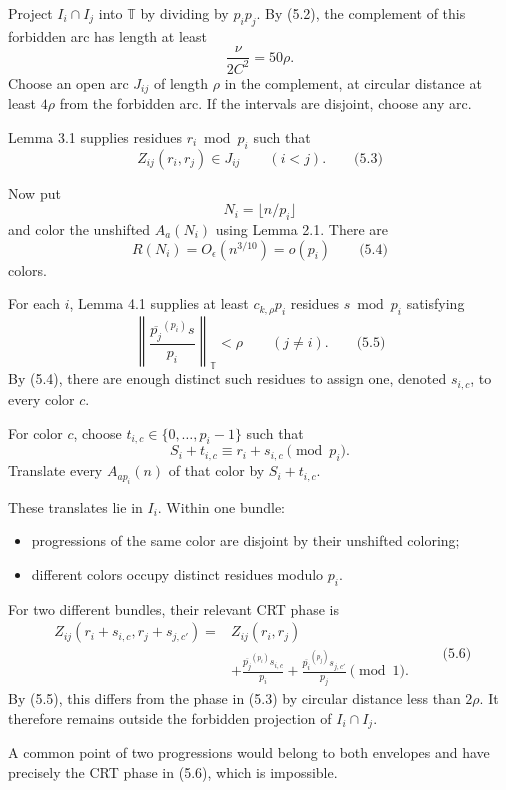 \documentclass[
  11pt,
  a4paper,
]{article}
\providecommand{\tightlist}{%
  \setlength{\itemsep}{0pt}\setlength{\parskip}{0pt}}
\begin{document}
Project \(I_i\cap I_j\) into \(\mathbb T\) by dividing by \(p_ip_j\). By
(5.2), the complement of this forbidden arc has length at least \[
\frac{\nu}{2C^2}=50\rho.
\] Choose an open arc \(J_{ij}\) of length \(\rho\) in the complement,
at circular distance at least \(4\rho\) from the forbidden arc. If the
intervals are disjoint, choose any arc.

Lemma 3.1 supplies residues \(r_i\bmod p_i\) such that \[
Z_{ij}(r_i,r_j)\in J_{ij}
\qquad(i<j).
\qquad\text{(5.3)}
\]

Now put \[
N_i=\lfloor n/p_i\rfloor
\] and color the unshifted \(A_a(N_i)\) using Lemma 2.1. There are \[
R(N_i)=O_\epsilon(n^{3/10})=o(p_i)
\qquad\text{(5.4)}
\] colors.

For each \(i\), Lemma 4.1 supplies at least \(c_{k,\rho}p_i\) residues
\(s\bmod p_i\) satisfying \[
\left\|
\frac{\overline{p_j}^{(p_i)}s}{p_i}
\right\|_{\mathbb T}<\rho
\qquad(j\ne i).
\qquad\text{(5.5)}
\] By (5.4), there are enough distinct such residues to assign one,
denoted \(s_{i,c}\), to every color \(c\).

For color \(c\), choose \(t_{i,c}\in\{0,\ldots,p_i-1\}\) such that \[
S_i+t_{i,c}\equiv r_i+s_{i,c}\pmod{p_i}.
\] Translate every \(A_{ap_i}(n)\) of that color by \(S_i+t_{i,c}\).

These translates lie in \(I_i\). Within one bundle:

\begin{itemize}
\tightlist
\item
  progressions of the same color are disjoint by their unshifted
  coloring;
\item
  different colors occupy distinct residues modulo \(p_i\).
\end{itemize}

For two different bundles, their relevant CRT phase is \begin{equation*}
\begin{aligned}
Z_{ij}(r_i+s_{i,c},r_j+s_{j,c'})
={}&Z_{ij}(r_i,r_j)\\
&+\frac{\overline{p_j}^{(p_i)}s_{i,c}}{p_i}
+\frac{\overline{p_i}^{(p_j)}s_{j,c'}}{p_j}
\pmod1.
\end{aligned}
\qquad\text{(5.6)}
\end{equation*} By (5.5), this differs from the phase in (5.3) by
circular distance less than \(2\rho\). It therefore remains outside the
forbidden projection of \(I_i\cap I_j\).

A common point of two progressions would belong to both envelopes and
have precisely the CRT phase in (5.6), which is impossible.
\end{document}
